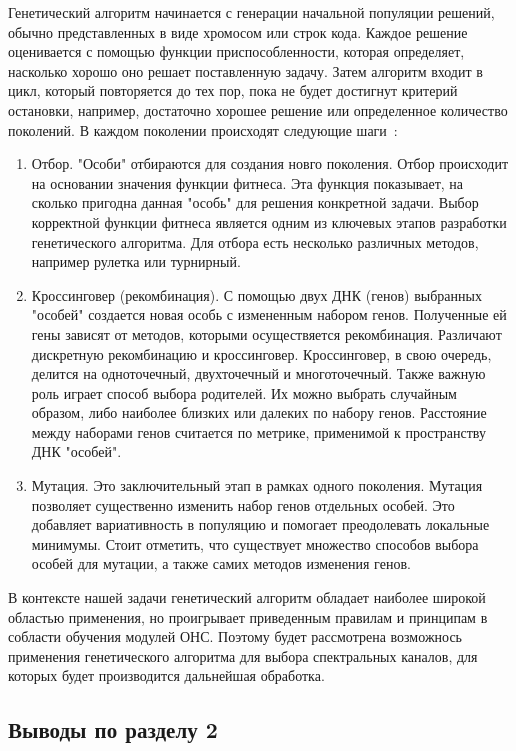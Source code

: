 \documentclass[14pt, russian]{scrartcl}
\begin{document}
Генетический алгоритм начинается с генерации начальной популяции решений, обычно представленных в виде хромосом или строк кода. Каждое решение оценивается с помощью функции приспособленности, которая определяет, насколько хорошо оно решает поставленную задачу.
Затем алгоритм входит в цикл, который повторяется до тех пор, пока не будет достигнут критерий остановки, например, достаточно хорошее решение или определенное количество поколений. В каждом поколении происходят следующие шаги~\cite{29}:
\begin{enumerate}
    \item Отбор. "Особи" отбираются для создания новго поколения. Отбор происходит на основании значения функции фитнеса. Эта функция показывает, на сколько пригодна данная "особь" для решения конкретной задачи. Выбор корректной функции фитнеса является одним из ключевых этапов разработки генетического алгоритма. Для отбора есть несколько различных методов, например рулетка или турнирный.
    \item Кроссинговер (рекомбинация). С помощью двух ДНК (генов) выбранных "особей" создается новая особь с измененным набором генов. Полученные ей гены зависят от методов, которыми осуществяется рекомбинация. Различают дискретную рекомбинацию и кроссинговер. Кроссинговер, в свою очередь, делится на одноточечный, двухточечный и многоточечный. Также важную роль играет способ выбора родителей. Их можно выбрать случайным образом, либо наиболее близких или далеких по набору генов. Расстояние между наборами генов считается по метрике, применимой к пространству ДНК "особей".
    \item Мутация. Это заключительный этап в рамках одного поколения. Мутация позволяет существенно изменить набор генов отдельных особей. Это добавляет вариативность в популяцию и помогает преодолевать локальные минимумы. Стоит отметить, что существует множество способов выбора особей для мутации, а также самих методов изменения генов.
\end{enumerate}
В контексте нашей задачи генетический алгоритм обладает наиболее широкой областью применения, но проигрывает приведенным правилам и принципам в собласти обучения модулей ОНС. 
Поэтому будет рассмотрена возможнось применения генетического алгоритма для выбора спектральных каналов, для которых будет производится дальнейшая обработка.

\subsection{Выводы по разделу 2}
\end{document}

